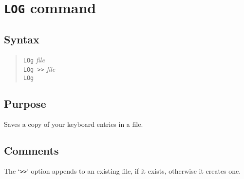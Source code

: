 %
%
%
%
\section{{\tt LOG} command}
\subsection{Syntax}
\begin{verse}
{\tt LOg} {\it file}\\
{\tt LOg >>} {\it file}\\
{\tt LOg}
\end{verse}
\subsection{Purpose}

Saves a copy of your keyboard entries in a file.
\subsection{Comments}

The `{\tt >>}' option appends to an existing file, if it exists, otherwise it
creates one.

